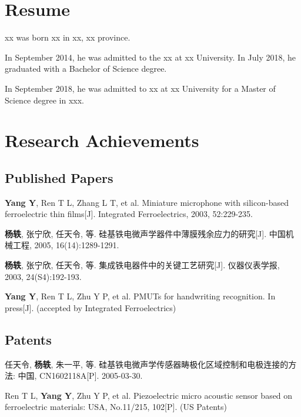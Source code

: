 
\begin{resume}

  \section*{Resume}

   xx was born xx in xx, xx province.
    
    In September 2014, he was admitted to the xx at xx University. In July 2018, he graduated with a Bachelor of Science degree.
    
    In September 2018, he was admitted to xx at xx University for a Master of Science degree in xxx.

  \section*{Research Achievements}

  \subsection*{Published Papers}

  \begin{achievements}
  
    \item \textbf{Yang Y}, Ren T L, Zhang L T, et al. Miniature microphone with silicon-based ferroelectric thin films[J]. Integrated Ferroelectrics, 2003, 52:229-235.
    \item \textbf{杨轶}, 张宁欣, 任天令, 等. 硅基铁电微声学器件中薄膜残余应力的研究[J]. 中国机械工程, 2005, 16(14):1289-1291.
    \item \textbf{杨轶}, 张宁欣, 任天令, 等. 集成铁电器件中的关键工艺研究[J]. 仪器仪表学报, 2003, 24(S4):192-193.
    \item \textbf{Yang Y}, Ren T L, Zhu Y P, et al. PMUTs for handwriting recognition. In press[J]. (accepted by Integrated Ferroelectrics)
    
  \end{achievements}



\subsection*{Patents}

 \begin{achievements}
  \item 任天令, \textbf{杨轶}, 朱一平, 等. 硅基铁电微声学传感器畴极化区域控制和电极连接的方法: 中国, CN1602118A[P]. 2005-03-30.
 \item Ren T L, \textbf{Yang Y}, Zhu Y P, et al. Piezoelectric micro acoustic sensor based on ferroelectric materials: USA, No.11/215, 102[P]. (US Patents)
\end{achievements}


\end{resume}
